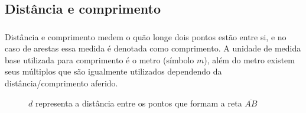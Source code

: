 \documentclass{beamer}
\begin{document}
\subsection{Distância e comprimento}
\begin{frame}\frametitle{\subsecname}
    Distância e comprimento medem o quão longe dois pontos estão entre si, e no caso de arestas essa medida é
    denotada como comprimento. A unidade de medida base utilizada para comprimento é o metro (símbolo ${m}$), além do
    metro existem seus múltiplos que são igualmente utilizados dependendo da distância/comprimento aferido.

    \begin{figure}[H]
        \centering
        \caption{$d$ representa a distância entre os pontos que formam a reta $\overline{AB}$}
    \end{figure}

\end{frame}


\begin{frame}\frametitle{\subsecname}
    \begin{table}[H]
    \end{table}
\end{frame}
\end{document}
